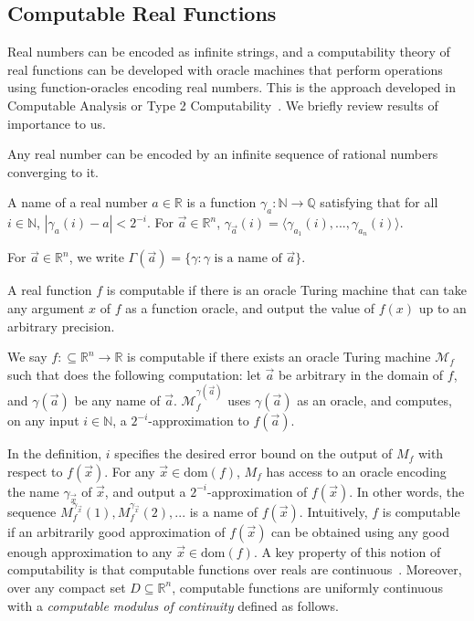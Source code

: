 \documentclass[envcountsect]{llncs}
\newcommand{\dom}{\mathrm{dom}}
\begin{document}
\subsection{Computable Real Functions}

Real numbers can be encoded as infinite strings, and a computability theory of real functions can be developed with oracle machines that perform operations using function-oracles encoding real numbers. This is the approach developed in Computable Analysis or Type 2 Computability~\cite{CAbook,Kobook,vasco}. We briefly review results of importance to us.

Any real number can be encoded by an infinite sequence of rational numbers converging to it. 
\begin{definition}[Names]
A name of a real number $a\in \mathbb{R}$ is a function $\mathcal{\gamma}_a: \mathbb{N}\rightarrow \mathbb{Q}$ satisfying that for all $i\in \mathbb{N}$, $|\gamma_a(i) - a|<2^{-i}.$ For $\vec a\in \mathbb{R}^n$, $\gamma_{\vec a}(i) = \langle \gamma_{a_1}(i), ..., \gamma_{a_n}(i)\rangle$.  
\end{definition}

For $\vec a\in \mathbb{R}^n$, we write $\Gamma(\vec a) = \{\gamma: \gamma\mbox{ is a name of }\vec a\}$. 

A real function $f$ is computable if there is an oracle Turing machine that can take any argument $x$ of $f$ as a function oracle, and output the value of $f(x)$ up to an arbitrary precision. 

\begin{definition} We say $f:\subseteq\mathbb{R}^n\rightarrow \mathbb{R}$ is computable if there exists an oracle Turing machine $\mathcal{M}_f$ such that does the following computation: let $\vec a$ be arbitrary in the domain of $f$, and $\gamma(\vec a)$ be any name of $\vec a$. $\mathcal{M}_f^{\gamma(\vec a)}$ uses $\gamma(\vec a)$ as an oracle, and computes, on any input $i\in \mathbb{N}$, a $2^{-i}$-approximation to $f(\vec a)$. 
\end{definition}



In the definition, $i$ specifies the desired error bound on the output of $M_f$ with respect to $f(\vec x)$. For any $\vec x\in \dom(f)$, $M_f$ has access to an oracle encoding the name $\gamma_{\vec x}$ of $\vec x$, and output a $2^{-i}$-approximation of $f(\vec x)$. In other words, the sequence $M_f^{\gamma_{\vec x}}(1), M_f^{\gamma_{\vec x}}(2), ...$ is a name of $f(\vec x)$. Intuitively, $f$ is computable if an arbitrarily good approximation of $f(\vec x)$ can be obtained using any good enough approximation to any $\vec x\in\dom(f)$. A key property of this notion of computability is that computable functions over reals are continuous~\cite{CAbook}. Moreover, over any compact set $D\subseteq \mathbb{R}^n$, computable functions are uniformly continuous with a {\em computable modulus of continuity} defined as follows. 
\end{document}

